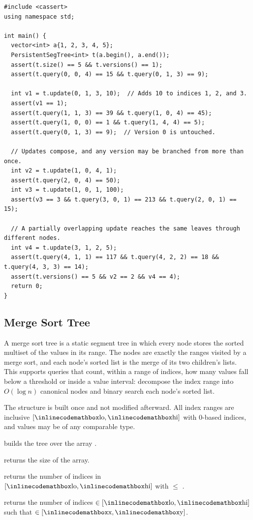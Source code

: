 \begin{lstlisting}[style=cpp]
#include <cassert>
using namespace std;

int main() {
  vector<int> a{1, 2, 3, 4, 5};
  PersistentSegTree<int> t(a.begin(), a.end());
  assert(t.size() == 5 && t.versions() == 1);
  assert(t.query(0, 0, 4) == 15 && t.query(0, 1, 3) == 9);

  int v1 = t.update(0, 1, 3, 10);  // Adds 10 to indices 1, 2, and 3.
  assert(v1 == 1);
  assert(t.query(1, 1, 3) == 39 && t.query(1, 0, 4) == 45);
  assert(t.query(1, 0, 0) == 1 && t.query(1, 4, 4) == 5);
  assert(t.query(0, 1, 3) == 9);  // Version 0 is untouched.

  // Updates compose, and any version may be branched from more than once.
  int v2 = t.update(1, 0, 4, 1);
  assert(t.query(2, 0, 4) == 50);
  int v3 = t.update(1, 0, 1, 100);
  assert(v3 == 3 && t.query(3, 0, 1) == 213 && t.query(2, 0, 1) == 15);

  // A partially overlapping update reaches the same leaves through different nodes.
  int v4 = t.update(3, 1, 2, 5);
  assert(t.query(4, 1, 1) == 117 && t.query(4, 2, 2) == 18 && t.query(4, 3, 3) == 14);
  assert(t.versions() == 5 && v2 == 2 && v4 == 4);
  return 0;
}
\end{lstlisting}
\subsection{Merge Sort Tree}
\label{sec:2.5.12}
A merge sort tree is a static segment tree in which every node stores the sorted multiset of the values in its range. The nodes are exactly the ranges visited by a merge sort, and each node's sorted list is the merge of its two children's lists. This supports queries that count, within a range of indices, how many values fall below a threshold or inside a value interval: decompose the index range into $O(\log n)$ canonical nodes and binary search each node's sorted list.

The structure is built once and not modified afterward. All index ranges are inclusive $[{\inlinecodemath{lo}}, {\inlinecodemath{hi}}]$ with 0-based indices, and values may be of any comparable type.

\begin{compactitem}
  \item {} builds the tree over the array .
  \item {} returns the size of the array.
  \item {} returns the number of indices  in $[{\inlinecodemath{lo}}, {\inlinecodemath{hi}}]$ with  $\leq$ .
  \item {} returns the number of indices  $\in [{\inlinecodemath{lo}}, {\inlinecodemath{hi}}]$ such that  $\in [{\inlinecodemath{x}}, {\inlinecodemath{y}}]$.
\end{compactitem}

